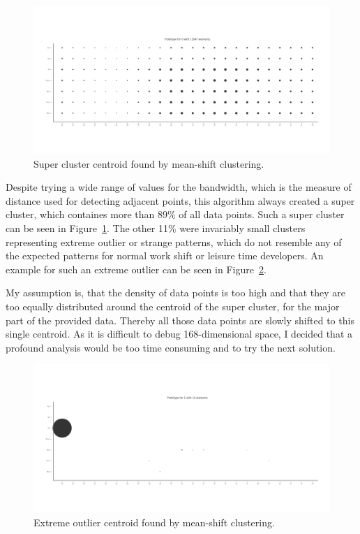\begin{figure}[H]
    \includegraphics[scale=0.32]{./graphs/analysis-mean-shift/supercluster}
    \centering
    \caption{Super cluster centroid found by mean-shift clustering.}\label{fig:mean-shift-super-cluster}
\end{figure}

Despite trying a wide range of values for the bandwidth, which is the measure of distance used for detecting adjacent points, this algorithm always created a super cluster, which containes more than 89\% of all data points.
Such a super cluster can be seen in Figure~\ref{fig:mean-shift-super-cluster}.
The other 11\% were invariably small clusters representing extreme outlier or strange patterns, which do not resemble any of the expected patterns for normal work shift or leisure time developers.
An example for such an extreme outlier can be seen in Figure~\ref{fig:mean-shift-outlier}.

My assumption is, that the density of data points is too high and that they are too equally distributed around the centroid of the super cluster, for the major part of the provided data.
Thereby all those data points are slowly shifted to this single centroid.
As it is difficult to debug 168-dimensional space, I decided that a profound analysis would be too time consuming and to try the next solution.

\begin{figure}[H]
    \includegraphics[scale=0.32]{./graphs/analysis-mean-shift/outlier}
    \centering
    \caption{Extreme outlier centroid found by mean-shift clustering.}\label{fig:mean-shift-outlier}
\end{figure}

